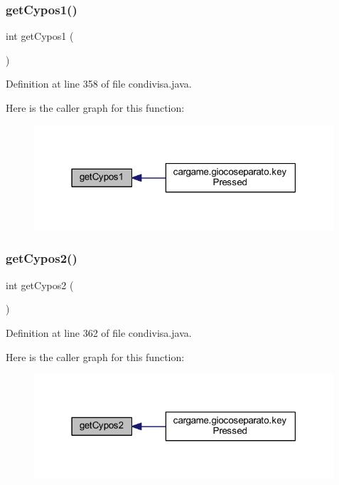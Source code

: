 \subsubsection{\texorpdfstring{get\+Cypos1()}{getCypos1()}}
{\footnotesize\ttfamily int get\+Cypos1 (\begin{DoxyParamCaption}{ }\end{DoxyParamCaption})}



Definition at line 358 of file condivisa.\+java.

Here is the caller graph for this function\+:
\nopagebreak
\begin{figure}[H]
\begin{center}
\leavevmode
\includegraphics[width=316pt]{classcargame_1_1condivisa_ada67793f376b8b32838932eb4fde8873_icgraph}
\end{center}
\end{figure}
\mbox{\label{classcargame_1_1condivisa_ab355a204dacee68d747ca55a2a36905e}} 
\subsubsection{\texorpdfstring{get\+Cypos2()}{getCypos2()}}
{\footnotesize\ttfamily int get\+Cypos2 (\begin{DoxyParamCaption}{ }\end{DoxyParamCaption})}



Definition at line 362 of file condivisa.\+java.

Here is the caller graph for this function\+:
\nopagebreak
\begin{figure}[H]
\begin{center}
\leavevmode
\includegraphics[width=316pt]{classcargame_1_1condivisa_ab355a204dacee68d747ca55a2a36905e_icgraph}
\end{center}
\end{figure}
\mbox{\label{classcargame_1_1condivisa_a9dd958f70987f67ad2360cefe9266053}} 
